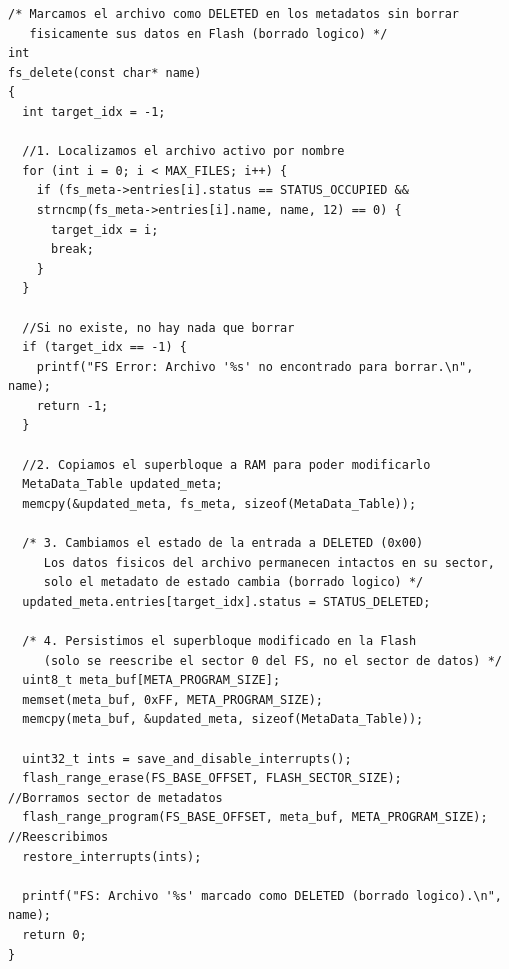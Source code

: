\documentclass[12pt,letterpaper]{article}
\begin{document}
\begin{lstlisting}[style=modernc, caption={Módulo 4A: borrado lógico sin tocar los datos en Flash}]
/* Marcamos el archivo como DELETED en los metadatos sin borrar
   fisicamente sus datos en Flash (borrado logico) */
int
fs_delete(const char* name)
{
  int target_idx = -1;
  
  //1. Localizamos el archivo activo por nombre
  for (int i = 0; i < MAX_FILES; i++) {
    if (fs_meta->entries[i].status == STATUS_OCCUPIED &&
	strncmp(fs_meta->entries[i].name, name, 12) == 0) {
      target_idx = i;
      break;
    }
  }
  
  //Si no existe, no hay nada que borrar
  if (target_idx == -1) {
    printf("FS Error: Archivo '%s' no encontrado para borrar.\n", name);
    return -1;
  }
  
  //2. Copiamos el superbloque a RAM para poder modificarlo
  MetaData_Table updated_meta;
  memcpy(&updated_meta, fs_meta, sizeof(MetaData_Table));
  
  /* 3. Cambiamos el estado de la entrada a DELETED (0x00)
     Los datos fisicos del archivo permanecen intactos en su sector,
     solo el metadato de estado cambia (borrado logico) */
  updated_meta.entries[target_idx].status = STATUS_DELETED;
  
  /* 4. Persistimos el superbloque modificado en la Flash
     (solo se reescribe el sector 0 del FS, no el sector de datos) */
  uint8_t meta_buf[META_PROGRAM_SIZE];
  memset(meta_buf, 0xFF, META_PROGRAM_SIZE);
  memcpy(meta_buf, &updated_meta, sizeof(MetaData_Table));
  
  uint32_t ints = save_and_disable_interrupts();
  flash_range_erase(FS_BASE_OFFSET, FLASH_SECTOR_SIZE);             //Borramos sector de metadatos
  flash_range_program(FS_BASE_OFFSET, meta_buf, META_PROGRAM_SIZE); //Reescribimos
  restore_interrupts(ints);
  
  printf("FS: Archivo '%s' marcado como DELETED (borrado logico).\n", name);
  return 0;
}
\end{lstlisting}
\end{document}
